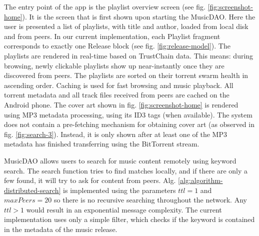 The entry point of the app is the playlist overview screen (see fig. \ref{fig:screenshot-home}). It is the screen that is first shown upon starting the MusicDAO. Here the user is presented a list of playlists, with title and author, loaded from local disk and from peers. In our current implementation, each Playlist fragment corresponds to exactly one Release block (see fig. \ref{fig:release-model}). The playlists are rendered in real-time based on TrustChain data. This means: during browsing, newly clickable playlists show up near-instantly once they are discovered from peers. The playlists are sorted on their torrent swarm health in ascending order. Caching is used for fast browsing and music playback. All torrent metadata and all track files received from peers are cached on the Android phone. The cover art shown in fig. \ref{fig:screenshot-home} is rendered using MP3 metadata processing, using its ID3 tags (when available). The system does not contain a pre-fetching mechanism for obtaining cover art (as observed in fig. \ref{fig:search-3}). Instead, it is only shown after at least one of the MP3 metadata has finished transferring using the BitTorrent stream.

\label{sec:searching-musiccommunity-impl}
MusicDAO allows users to search for music content remotely using keyword search. The search function tries to find matches locally, and if there are only a few found, it will try to ask for content from peers. Alg. \ref{alg:algorithm-distributed-search} is implemented using the parameters $ttl=1$ and $maxPeers=20$ so there is no recursive searching throughout the network. Any $ttl>1$ would result in an exponential message complexity. The current implementation uses only a simple filter, which checks if the keyword is contained in the metadata of the music release.

